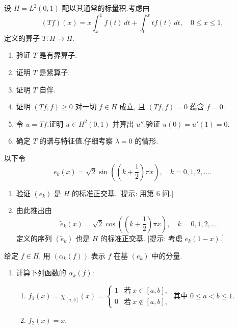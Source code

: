\begin{exercise}
\label{exer:8.28}
设 $H=L^2(0,1)$ 配以其通常的标量积.考虑由
\begin{equation*}
(Tf)(x)=x\int_x^1f(t)\,dt+\int_0^xtf(t)\,dt,
\quad 0\le x\le1,
\end{equation*}
定义的算子 $T:H\to H$.
\begin{enumerate}[label=\arabic*., leftmargin=2.2em, itemsep=0.3em]
	\item 验证 $T$ 是有界算子.
	\item 证明 $T$ 是紧算子.
	\item 证明 $T$ 自伴.
	\item 证明 $(Tf,f)\ge0$ 对一切 $f\in H$ 成立, 且 $(Tf,f)=0$ 蕴含
	      $f=0$.
	\item 令 $u=Tf$.证明 $u\in H^2(0,1)$ 并算出 $u''$.验证
	      $u(0)=u'(1)=0$.
	\item 确定 $T$ 的谱与特征值.仔细考察 $\lambda=0$ 的情形.
\end{enumerate}
以下令
\begin{equation*}
e_k(x)=\sqrt2\sin\left(\left(k+\frac12\right)\pi x\right),
\quad k=0,1,2,\dots.
\end{equation*}
\begin{enumerate}[label=\arabic*., leftmargin=2.2em, itemsep=0.3em, start=7]
	\item 验证 $(e_k)$ 是 $H$ 的标准正交基.
	      [提示: 用第 6 问.]
	\item 由此推出由
	      \begin{equation*}
	      \tilde e_k(x)=\sqrt2\cos\left(\left(k+\frac12\right)\pi x\right),
	      \quad k=0,1,2,\dots
	      \end{equation*}
	      定义的序列 $(\tilde e_k)$ 也是 $H$ 的标准正交基.
	      [提示: 考虑 $e_k(1-x)$.]
\end{enumerate}
给定 $f\in H$, 用 $(\alpha_k(f))$ 表示 $f$ 在基 $(e_k)$ 中的分量.
\begin{enumerate}[label=\arabic*., leftmargin=2.2em, itemsep=0.3em, start=9]
	\item 计算下列函数的 $\alpha_k(f)$:
	      \begin{enumerate}[label=(\alph*), leftmargin=2.2em, itemsep=0.2em]
	      	\item $f_1(x)=\chi_{[a,b]}(x)=
	      	      \begin{cases}1 & \text{若}\ x\in[a,b],\\
	      	      0 & \text{若}\ x\notin[a,b],\end{cases}$
	      	      其中 $0\le a<b\le1$.
	      	\item $f_2(x)=x$.

\end{enumerate}
\end{enumerate}
\end{exercise}
